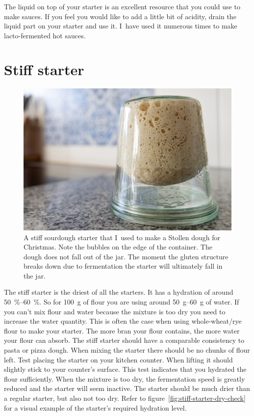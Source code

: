 The liquid on top of your starter is an excellent resource that you could use
to make sauces. If you feel you would like to add a little bit of acidity,
drain the liquid part on your starter and use it. I~have used it numerous
times to make lacto-fermented hot sauces.

\section{Stiff starter}%
\label{section:stiff-starter}

\begin{figure}[!htb]
  \includegraphics[width=\textwidth]{sourdough-starter-stiff.jpg}
  \caption[Stiff starter upside-down]{A stiff sourdough starter that I~used to
      make a Stollen dough for Christmas. Note the bubbles on the edge of the
      container. The dough does not fall out of the jar. The moment
      the gluten structure breaks down due to fermentation the starter
      will ultimately fall in the jar.}%
  \label{flc:stiff-sourdough-starter}
\end{figure}

The stiff starter is the driest of all the starters. It has a hydration of
around \qtyrange{50}{60}{\percent}. So for \qty{100}{\gram} of flour you are using around
\qtyrange{50}{60}{\gram} of water. If you can't mix flour and water because the
mixture is too dry you need to increase the water quantity. This is often
the case when using whole-wheat/rye flour to make your starter. The
more bran your flour contains, the more water your flour can absorb. The stiff
starter should have a comparable consistency to pasta or pizza dough. When
mixing the starter there should be no chunks of flour left. Test placing
the starter on your kitchen counter. When lifting it should slightly stick
to your counter's surface. This test indicates that you hydrated the flour sufficiently.
When the mixture is too dry, the fermentation speed is greatly reduced and
the starter will seem inactive. The starter should be much drier
than a regular starter, but also not too dry. Refer to figure~\ref{fig:stiff-starter-dry-check}
for a visual example of the starter's required hydration level.

